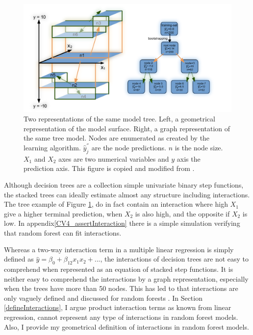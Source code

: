 \begin{figure}[!htbp]
\includegraphics[width=\textwidth,height=\textheight,keepaspectratio]{graphics/randomForest_explained_thesisVersion.pdf}
\caption{Two representations of the same model tree. Left, a geometrical representation of the model surface. Right, a graph representation of the same tree model. Nodes are enumerated as created by the learning algorithm. $\hat{y}^{''}_j$ are the node predictions. $n$ is the node size. $X_1$ and $X_2$ axes are two numerical variables and $y$ axis the prediction axis. This figure is copied and modified from \cite{welling2016forest}.}
\label{simpleTree}
\end{figure}

Although decision trees are a collection simple univariate binary step functions, the stacked trees can ideally estimate almost any structure including interactions. The tree example of Figure \ref{simpleTree}, do in fact contain an interaction where high $X_1$ give a higher terminal prediction, when $X_2$ is also high, and the opposite if $X_2$ is low. In appendix\ref{CV4_assertInteraction} there is a simple simulation verifying that random forest can fit interactions.

Whereas a two-way interaction term in a multiple linear regression is simply defined as  $\hat{y} = \beta_0 + \beta_{12} x_1 x_2 + ...$, the interactions of decision trees are not easy to comprehend when represented as an equation of stacked step functions. It is neither easy to comprehend the interactions by a graph representation, especially when the trees have more than 50 nodes. This has led to that interactions are only vaguely defined and discussed for random forests \cite{boulesteix2014letter}. In Section \ref{defineInteractions}, I argue product interaction terms as known from linear regression, cannot represent any type of interactions in random forest models. Also, I provide my geometrical definition of interactions in random forest models.

